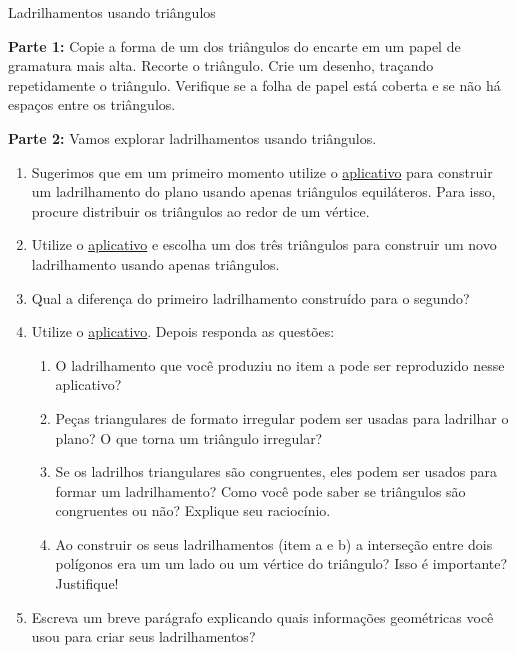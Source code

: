 \begin{task}{Ladrilhamentos usando triângulos}\label{at_lad_tri}

\textbf{Parte 1:} Copie a forma de um dos triângulos do encarte em um papel de gramatura mais alta. Recorte o triângulo. Crie um desenho, traçando repetidamente o triângulo. Verifique se a folha de papel está coberta e se não há espaços entre os triângulos.

\textbf{Parte 2:} Vamos explorar  ladrilhamentos  usando triângulos. 
\begin{enumerate}

\item Sugerimos que em um primeiro momento utilize o  \href{https://www.geogebra.org/m/uuafzw8k}{aplicativo}  para construir um ladrilhamento do plano usando apenas triângulos equiláteros. Para isso, procure distribuir os triângulos ao redor de um vértice.

\item Utilize o  \href{https://www.geogebra.org/m/junvq3qd}{aplicativo} e escolha um dos três triângulos para construir um novo ladrilhamento usando apenas triângulos.
\item Qual a diferença do primeiro ladrilhamento construído para o segundo?
\item Utilize o  \href{https://www.geogebra.org/m/ejfw44rt}{aplicativo}. Depois responda as questões:
\begin{enumerate}
\item O ladrilhamento que você produziu no item a pode ser reproduzido nesse aplicativo?
\item 	Peças triangulares de formato irregular podem ser usadas para ladrilhar o plano? O que torna um triângulo irregular?
\item  Se os ladrilhos triangulares são congruentes, eles podem ser usados para formar um ladrilhamento? Como você pode saber se triângulos  são congruentes ou não? Explique seu raciocínio.
\item 	Ao construir os seus ladrilhamentos (item a e b) a interseção entre dois polígonos era um um lado ou um vértice do triângulo? Isso é importante? Justifique! 
\end{enumerate}
\item Escreva um breve parágrafo explicando quais informações geométricas você usou para criar seus ladrilhamentos? 
\end{enumerate}

\end{task}

